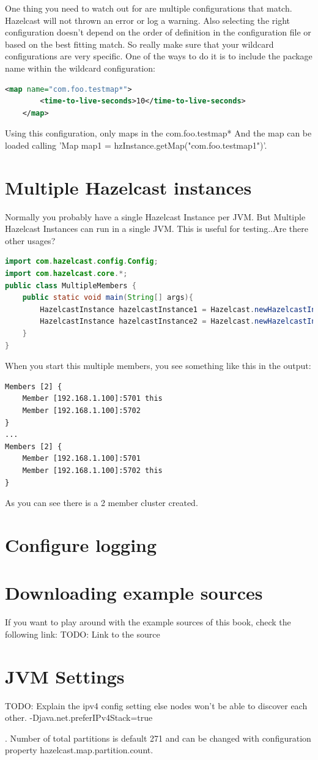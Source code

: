 One thing you need to watch out for are multiple configurations that match. Hazelcast will not thrown an error or log a warning. Also selecting the right configuration doesn't depend on the order of definition in the configuration file or based on the best fitting match. So really make sure that your wildcard configurations are very specific. One of the ways to do it is to include the package name within the wildcard configuration:
\begin{lstlisting}[language=xml]
    <map name="com.foo.testmap*">
        <time-to-live-seconds>10</time-to-live-seconds>
    </map>
\end{lstlisting}
Using this configuration, only maps in the com.foo.testmap* 
And the map can be loaded calling 'Map map1 = hzInstance.getMap("com.foo.testmap1")'. 

\section{Multiple Hazelcast instances}
Normally you probably have a single Hazelcast Instance per JVM. But 
Multiple Hazelcast Instances can run in a single JVM. This is useful for testing..Are there other usages?

\begin{lstlisting}[language=java]
import com.hazelcast.config.Config;
import com.hazelcast.core.*;
public class MultipleMembers {
    public static void main(String[] args){
        HazelcastInstance hazelcastInstance1 = Hazelcast.newHazelcastInstance(null);
        HazelcastInstance hazelcastInstance2 = Hazelcast.newHazelcastInstance(null);
    }
}
\end{lstlisting}
When you start this multiple members, you see something like this in the output:
\begin{verbatim}
Members [2] {
    Member [192.168.1.100]:5701 this
    Member [192.168.1.100]:5702
}
...
Members [2] {
    Member [192.168.1.100]:5701
    Member [192.168.1.100]:5702 this
}
\end{verbatim}
As you can see there is a 2 member cluster created.

\section{Configure logging}

\section{Downloading example sources}
If you want to play around with the example sources of this book, check the following link:
TODO: Link to the source

\section{JVM Settings}
TODO: Explain the ipv4 config setting else nodes won't be able to discover each other.
-Djava.net.preferIPv4Stack=true

. Number of total partitions is default 271 and can be changed with configuration property hazelcast.map.partition.count. 
